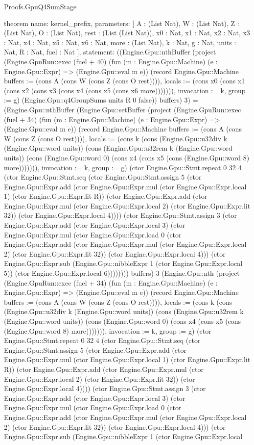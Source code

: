 \begin{lexlean}{Proofs.GpuQ4SumStage}
\begin{semanticmodule}
theorem{
  name: kernel_prefix,
  parameters: [
    A : (List Nat),
    W : (List Nat),
    Z : (List Nat),
    O : (List Nat),
    rest : (List (List Nat)),
    x0 : Nat,
    x1 : Nat,
    x2 : Nat,
    x3 : Nat,
    x4 : Nat,
    x5 : Nat,
    x6 : Nat,
    more : (List Nat),
    k : Nat,
    g : Nat,
    units : Nat,
    R : Nat,
    fuel : Nat
  ],
  statement: ((Engine.Gpu::nthBuffer (project (Engine.GpuRun::exec (fuel + 40) (fun (m : Engine.Gpu::Machine) (e : Engine.Gpu::Expr) => (Engine.Gpu::eval m e)) (record Engine.Gpu::Machine {buffers := (cons A (cons W (cons Z (cons O rest)))), locals := (cons x0 (cons x1 (cons x2 (cons x3 (cons x4 (cons x5 (cons x6 more))))))), invocation := k, group := g}) (Engine.Gpu::q4GroupSums units R 0 false)) buffers) 3) = (Engine.Gpu::nthBuffer (Engine.Gpu::setBuffer (project (Engine.GpuRun::exec (fuel + 34) (fun (m : Engine.Gpu::Machine) (e : Engine.Gpu::Expr) => (Engine.Gpu::eval m e)) (record Engine.Gpu::Machine {buffers := (cons A (cons W (cons Z (cons O rest)))), locals := (cons k (cons (Engine.Gpu::u32div k (Engine.Gpu::word units)) (cons (Engine.Gpu::u32rem k (Engine.Gpu::word units)) (cons (Engine.Gpu::word 0) (cons x4 (cons x5 (cons (Engine.Gpu::word 8) more))))))), invocation := k, group := g}) (ctor Engine.Gpu::Stmt.repeat 0 32 4 (ctor Engine.Gpu::Stmt.seq (ctor Engine.Gpu::Stmt.assign 5 (ctor Engine.Gpu::Expr.add (ctor Engine.Gpu::Expr.mul (ctor Engine.Gpu::Expr.local 1) (ctor Engine.Gpu::Expr.lit R)) (ctor Engine.Gpu::Expr.add (ctor Engine.Gpu::Expr.mul (ctor Engine.Gpu::Expr.local 2) (ctor Engine.Gpu::Expr.lit 32)) (ctor Engine.Gpu::Expr.local 4)))) (ctor Engine.Gpu::Stmt.assign 3 (ctor Engine.Gpu::Expr.add (ctor Engine.Gpu::Expr.local 3) (ctor Engine.Gpu::Expr.mul (ctor Engine.Gpu::Expr.load 0 (ctor Engine.Gpu::Expr.add (ctor Engine.Gpu::Expr.mul (ctor Engine.Gpu::Expr.local 2) (ctor Engine.Gpu::Expr.lit 32)) (ctor Engine.Gpu::Expr.local 4))) (ctor Engine.Gpu::Expr.sub (Engine.Gpu::nibbleExpr 1 (ctor Engine.Gpu::Expr.local 5)) (ctor Engine.Gpu::Expr.local 6)))))))) buffers) 3 (Engine.Gpu::nth (project (Engine.GpuRun::exec (fuel + 34) (fun (m : Engine.Gpu::Machine) (e : Engine.Gpu::Expr) => (Engine.Gpu::eval m e)) (record Engine.Gpu::Machine {buffers := (cons A (cons W (cons Z (cons O rest)))), locals := (cons k (cons (Engine.Gpu::u32div k (Engine.Gpu::word units)) (cons (Engine.Gpu::u32rem k (Engine.Gpu::word units)) (cons (Engine.Gpu::word 0) (cons x4 (cons x5 (cons (Engine.Gpu::word 8) more))))))), invocation := k, group := g}) (ctor Engine.Gpu::Stmt.repeat 0 32 4 (ctor Engine.Gpu::Stmt.seq (ctor Engine.Gpu::Stmt.assign 5 (ctor Engine.Gpu::Expr.add (ctor Engine.Gpu::Expr.mul (ctor Engine.Gpu::Expr.local 1) (ctor Engine.Gpu::Expr.lit R)) (ctor Engine.Gpu::Expr.add (ctor Engine.Gpu::Expr.mul (ctor Engine.Gpu::Expr.local 2) (ctor Engine.Gpu::Expr.lit 32)) (ctor Engine.Gpu::Expr.local 4)))) (ctor Engine.Gpu::Stmt.assign 3 (ctor Engine.Gpu::Expr.add (ctor Engine.Gpu::Expr.local 3) (ctor Engine.Gpu::Expr.mul (ctor Engine.Gpu::Expr.load 0 (ctor Engine.Gpu::Expr.add (ctor Engine.Gpu::Expr.mul (ctor Engine.Gpu::Expr.local 2) (ctor Engine.Gpu::Expr.lit 32)) (ctor Engine.Gpu::Expr.local 4))) (ctor Engine.Gpu::Expr.sub (Engine.Gpu::nibbleExpr 1 (ctor Engine.Gpu::Expr.local }
\end{semanticmodule}
\end{lexlean}
